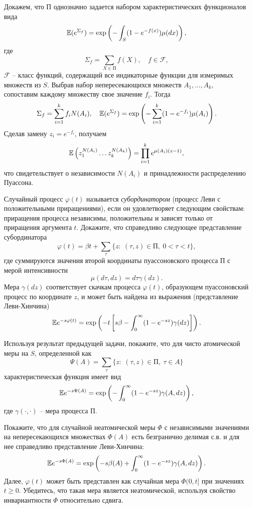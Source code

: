 \begin{problem}
\begin{ordre}
Докажем, что $\text{П}$ однозначно задается набором характеристических функционалов вида
\[
\mathrm{{\mathbb E}}(e^{\Sigma_f}) = \exp \left( - \int_{S}(1 - e^{-f(x)}) \mu(dx)  \right),
\]
где 
\[
\Sigma_f = \sum_{X \in \text{П}} f(X), \quad f \in \mathcal{F},
\]
$\mathcal{F}$ -- класс функций, содержащий все индикаторные функции для измеримых множеств из $S$. Выбрав набор непересекающихся множеств $A_1,\ldots,A_k$, сопоставим 
каждому множеству свое значение $f_i$. Тогда
\[
\Sigma_f  = \sum_{i=1}^k f_i N(A_i), \quad
\mathrm{{\mathbb E}}(e^{\Sigma_f}) = \exp \left( - \sum_{i=1}^k (1 - e^{-f_i}) \mu(A_i)  \right).
\]    
Сделав замену $z_i  = e^{-f_i}$, получаем
\[
\mathrm{{\mathbb E}} \left(z_1^{N(A_i)} \ldots z_k^{N(A_k)} \right) = \prod_{i=1}^k e^{\mu (A_i) (z-1)},
\]  
что свидетельствует о независимости $N(A_i)$ и принадлежности распределению Пуассона.
\end{ordre}

\end{problem}

\begin{problem}
\label{subord}
Случайный процесс $\varphi(t)$ называется \textit{субординатором} (процесс Леви с положительными приращениями), если он удовлетворяет следующим свойствам: приращения  процесса независимы, положительны и зависят только от приращения аргумента $t$. Докажите, что  справедливо следующее представление субординатора 
\[
\varphi(t) = \beta t + \sum_{\tau} \{z: \; (\tau, z) \in  \text{П}, \; 0 < \tau < t  \},
\]
где суммируются значения второй координаты пуассоновского процесса $\text{П}$ с мерой интенсивности
\[
\mu(d\tau, dz) = d\tau \gamma(dz). 
\]
Мера $\gamma(dz)$ соответствует скачкам процесса  $\varphi(t)$, образующем пуассоновский процесс по координате $z$, и может быть найдена из выражения (представление Леви-Хинчина)
\[
\mathrm{{\mathbb E}}  e^{ -s \varphi(t)} = \exp \left(
-t \left[ s\beta - \int_{0}^{\infty} (1 - e^{-s z}) \gamma(dz)  \right]
 \right). 
\] 
\end{problem}

\begin{ordre}
Используя результат предыдущей задачи, покажите, что для чисто атомической меры на $S$, определенной как  
\[
\Psi(A)  = \sum_{\tau} \{z: \; (\tau, z) \in  \text{П}, \;  \tau \in A\} 
\]  
характеристическая функция имеет вид
\[
\mathrm{{\mathbb E}}  e^{ -s \Psi(A) } = \exp \left(
- \int_{0}^{\infty} (1 - e^{-s z}) \gamma(A, dz) 
 \right),
\]
где $\gamma(\cdot, \cdot)$ --  мера процесса $\text{П}$.

Покажите, что для случайной неатомической меры $\Phi$ с независимыми значениями на непересекающихся множествах $\Phi(A)$ есть безгранично делимая с.в. и для нее  справедливо представление  Леви-Хинчина: 
\[
\mathrm{{\mathbb E}}  e^{ -s \Phi(A)} = \exp \left(
 - s\beta(A) + \int_{0}^{\infty} (1 - e^{-s z}) \gamma(A, dz) 
 \right). 
\]  
Далее, $\varphi(t)$ может быть представлен как случайная мера $\Phi(0,t]$ при значениях $t \geq 0$. Убедитесь, что такая мера является неатомической, используя свойство инвариантности $\Phi$ относительно сдвига. 
\end{ordre}

